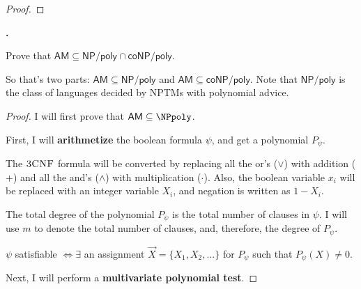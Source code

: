 \documentclass[letterpaper,11pt]{article}
\newcommand{\cc}[1]{\ensuremath{\textsf{#1}}\xspace}
\newcommand{\NP}{\cc{NP}}
\newcommand{\coNP}{\cc{coNP}}
\newcommand{\AM}{\cc{AM}}
\newcounter{problem}
\newenvironment{problem}%
{%
	\stepcounter{problem}%
	\textbf{\theproblem.}
	\large
}{\\}%
\begin{document}
\begin{proof}
\end{proof}


\begin{problem}
Prove that $\AM \subseteq \NP/\textsf{poly} \cap \coNP/\textsf{poly}$. 

So that's two parts: $\AM \subseteq \NP/\textsf{poly}$ and $\AM \subseteq \coNP/\textsf{poly}$. 
Note that $\NP/\textsf{poly}$ is the class of languages decided by NPTMs with polynomial advice. 
\end{problem}

\begin{proof}
I will first prove that $\AM \subseteq \NPpoly$.

First, I will {\bf arithmetize} the boolean formula $\psi$, and get a polynomial $P_\psi$.

The $\textsc{3CNF}$ formula will be converted by replacing all the or's ($\vee$) with addition ($+$) and all the and's ($\wedge$) with multiplication ($\cdot$). 
Also, the boolean variable $x_i$ will be replaced with an integer variable $X_i$, and negation is written as $1-X_i$.

The total degree of the polynomial $P_\psi$ is the total number of clauses in $\psi$.
I will use $m$ to denote the total number of clauses, and, therefore, the degree of $P_\psi$.

$\psi$ satisfiable $\Leftrightarrow \exists$ an assignment $\vec{X}=\{X_1,X_2,...\}$ for $P_\psi$ such that $P_\psi(X) \neq 0$.

Next, I will perform a {\bf multivariate polynomial test}.
\end{proof}
\end{document}
